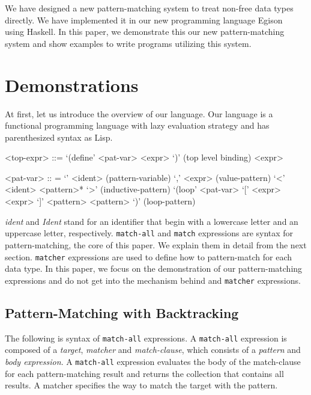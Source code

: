 \documentclass{article}
\begin{document}
We have designed a new pattern-matching system to treat non-free data types directly.
We have implemented it in our new programming language Egison~\cite{egison} using Haskell.
In this paper, we demonstrate this our new pattern-matching system and show examples to write programs utilizing this system.

\section{Demonstrations}\label{exprs}

At first, let us introduce the overview of our language.
Our language is a functional programming language with lazy evaluation strategy and has parenthesized syntax as Lisp.

\begin{grammar}
<top-expr> ::= `(define' <pat-var> <expr> `)' \hfill (top level binding)
\alt <expr>

<pat-var> :: = `' <ident> \hfill (pattern-variable)
  \alt `,' <expr> \hfill (value-pattern)
  \alt `<' <ident> <pattern>* `>' \hfill (inductive-pattern)
  \alt `(loop' <pat-var> `[' <expr> <expr> `]' <pattern> <pattern> `)' \hfill (loop-pattern)
\end{grammar}

\textit{ident} and \textit{Ident} stand for an identifier that begin with a lowercase letter and an uppercase letter, respectively.
\texttt{match-all} and \texttt{match} expressions are syntax for pattern-matching, the core of this paper.
We explain them in detail from the next section.
\texttt{matcher} expressions are used to define how to pattern-match for each data type.
In this paper, we focus on the demonstration of our pattern-matching expressions and do not get into the mechanism behind and \texttt{matcher} expressions.

\subsection{Pattern-Matching with Backtracking}

The following is syntax of \texttt{match-all} expressions.
A \texttt{match-all} expression is composed of a \textit{target}, \textit{matcher} and \textit{match-clause}, which consists of a \textit{pattern} and \textit{body expression}.
A \texttt{match-all} expression evaluates the body of the match-clause for each pattern-matching result and returns the collection that contains all results.
A matcher specifies the way to match the target with the pattern.
\end{document}
